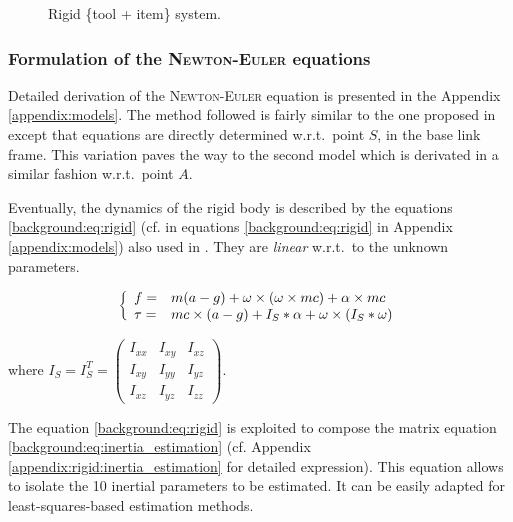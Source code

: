 \documentclass[/home/francois/latex/report/main.tex]{subfiles}
\begin{document}
\begin{figure}[H]
\centering
   \caption{Rigid \{tool + item\} system.}
   \label{fig:tikz:one_body}
\end{figure}

\subsubsection{Formulation of the \textsc{Newton-Euler} equations}
\label{subsubsection:background_newton_equation}

Detailed derivation of the \textsc{Newton-Euler} equation is presented in the Appendix \ref{appendix:models}. The method followed is fairly similar to the one proposed in \cite{An1985} except that equations are directly determined w.r.t.\ point $S$, in the base link frame. This variation paves the way to the second model which is derivated in a similar fashion w.r.t.\ point $A$.

Eventually, the dynamics of the rigid body is described by the equations \ref{background:eq:rigid} (cf. in equations \ref{background:eq:rigid} in Appendix \ref{appendix:models}) also used in \cite{Kubus2008, Kubus2007, Kubus2014, Farsoni2018}. They are \textit{linear} w.r.t.\ to the unknown parameters.

\begin{equation}
 \label{background:eq:rigid}
 \left \{
 \begin{array}{l l}
  f =    & m (a - g) + \omega \times (\omega \times m c) + \alpha \times m c \\
  \tau = & m c \times (a - g)
  + I_{S} \ast \alpha + \omega \times (I_{S} \ast \omega)
 \end{array}
 \right.
\end{equation}

where $I_S = I_S^T =
\begin{pmatrix}
 I_{xx} & I_{xy} & I_{xz} \\
 I_{xy} & I_{yy} & I_{yz} \\
 I_{xz} & I_{yz} & I_{zz}
\end{pmatrix}
$.

The equation \ref{background:eq:rigid} is exploited to compose the matrix equation \ref{background:eq:inertia_estimation} (cf. Appendix \ref{appendix:rigid:inertia_estimation} for detailed expression). This equation allows to isolate the 10 inertial parameters to be estimated. It can be easily adapted for least-squares-based estimation methods.
\end{document}
